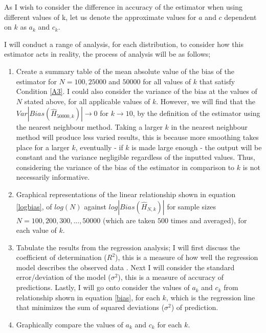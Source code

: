 \documentclass{report}
\begin{document}
As I wish to consider the difference in accuracy of the estimator when using different values of k, let us denote the approximate values for $a$ and $c$ dependent on $k$ as $a_{k}$ and $c_{k}$.

I will conduct a range of analysis, for each distribution, to consider how this estimator acts in reality, the process of analysis will be as follows;
\begin{enumerate}
\item Create a summary table of the mean absolute value of the bias of the estimator for $N=100, 25000$ and $50000$ for all values of $k$ that satisfy Condition \ref{A3}. I could also consider the variance of the bias at the values of $N$ stated above, for all applicable values of $k$. However, we will find that the $Var|Bias(\hat{H}_{50000, k})| \to 0$ for $k \to 10$, by the definition of the estimator using the nearest neighbour method. Taking a larger $k$ in the nearest neighbour method will produce less varied results, this is because more smoothing takes place for a larger $k$, eventually - if $k$ is made large enough - the output will be constant and the variance negligible regardless of the inputted values. Thus, considering the variance of the bias of the estimator in comparison to $k$ is not necessarily informative. 

\item Graphical representations of the linear relationship shown in equation \ref{logbias}, of $log(N)$ against $log|Bias(\hat{H}_{N, k})|$ for sample sizes $N=100, 200, 300, ..., 50000$ (which are taken $500$ times and averaged), for each value of $k$.

\item Tabulate the results from the regression analysis; I will first discuss the coefficient of determination ($R^2$), this is a measure
of how well the regression model describes the observed data \cite{regression1}. Next I will consider the standard error/deviation of the model ($\sigma^2$), this is a measure of accuracy of predictions. Lastly, I will go onto consider the values of $a_{k}$ and $c_{k}$ from relationship shown in equation \ref{bias}, for each $k$, which is the regression line that minimizes the sum of squared deviations ($\sigma^2$) of prediction.

\item Graphically compare the values of $a_{k}$ and $c_{k}$ for each $k$.

\end{enumerate}
\end{document}
